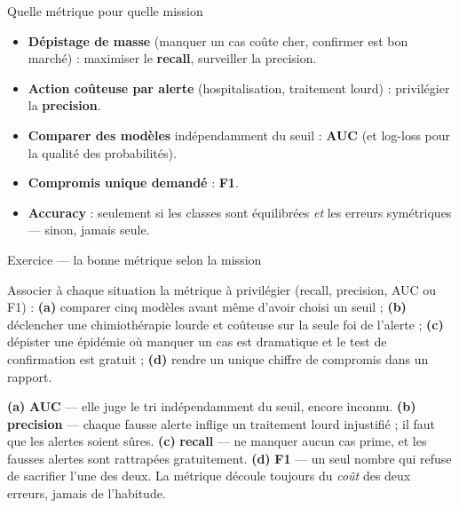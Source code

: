 \documentclass[aspectratio=169,11pt]{beamer}
\begin{document}
\begin{frame}{Quelle métrique pour quelle mission}
\begin{ucadret}
\begin{itemize}\small
  \item \textbf{Dépistage de masse} (manquer un cas coûte cher, confirmer est bon marché) : maximiser le \textbf{recall}, surveiller la precision.
  \item \textbf{Action coûteuse par alerte} (hospitalisation, traitement lourd) : privilégier la \textbf{precision}.
  \item \textbf{Comparer des modèles} indépendamment du seuil : \textbf{AUC} (et log-loss pour la qualité des probabilités).
  \item \textbf{Compromis unique demandé} : \textbf{F1}.
  \item \textbf{Accuracy} : seulement si les classes sont équilibrées \emph{et} les erreurs symétriques — sinon, jamais seule.
\end{itemize}
\end{ucadret}
\end{frame}

\begin{frame}{Exercice — la bonne métrique selon la mission}
\begin{ucadrec}[Énoncé]
{\small Associer à chaque situation la métrique à privilégier (recall, precision, AUC ou F1) : \textbf{(a)} comparer cinq modèles avant même d'avoir choisi un seuil ; \textbf{(b)} déclencher une chimiothérapie lourde et coûteuse sur la seule foi de l'alerte ; \textbf{(c)} dépister une épidémie où manquer un cas est dramatique et le test de confirmation est gratuit ; \textbf{(d)} rendre un unique chiffre de compromis dans un rapport.}
\end{ucadrec}
\pause
\begin{ucadex}[Correction]
{\small \textbf{(a)} \textbf{AUC} — elle juge le tri indépendamment du seuil, encore inconnu. \textbf{(b)} \textbf{precision} — chaque fausse alerte inflige un traitement lourd injustifié ; il faut que les alertes soient sûres. \textbf{(c)} \textbf{recall} — ne manquer aucun cas prime, et les fausses alertes sont rattrapées gratuitement. \textbf{(d)} \textbf{F1} — un seul nombre qui refuse de sacrifier l'une des deux. La métrique découle toujours du \emph{coût} des deux erreurs, jamais de l'habitude.}
\end{ucadex}
\end{frame}
\end{document}
